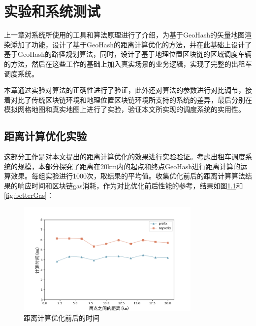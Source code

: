 \chapter{实验和系统测试}
上一章对系统所使用的工具和算法原理进行了介绍，为基于GeoHash的矢量地图渲染添加了功能，设计了基于GeoHash的距离计算优化的方法，并在此基础上设计了基于GeoHash的路径规划算法，同时，设计了基于地理位置区块链的区域调度车辆的方法，然后在这些工作的基础上加入真实场景的业务逻辑，实现了完整的出租车调度系统。

本章通过实验对算法的正确性进行了验证，此外还对算法的参数进行对比调节，接着对比了传统区块链环境和地理位置区块链环境所支持的系统的差异，最后分别在模拟网格地图和真实地图上进行了实验，验证本文所实现的调度系统的实用性。




\section{距离计算优化实验}
这部分工作是对本文提出的距离计算优化的效果进行实验验证。考虑出租车调度系统的规模，本部分探究了距离在20km内的起点和终点GeoHash进行距离计算的运算效果。每组实验进行1000次，取结果的平均值。收集优化前后的距离计算算法结果的响应时间和区块链gas消耗，作为对比优化前后性能的参考，结果如图\ref{fig:betterDistance}和\ref{fig:betterGas}：

\begin{figure}[h]
  \centering
  \includegraphics[height=0.3\textheight,width=0.8\textwidth]{figures/距离计算优化时间}
  \caption{距离计算优化前后的时间}\label{fig:betterDistance}
\end{figure}


